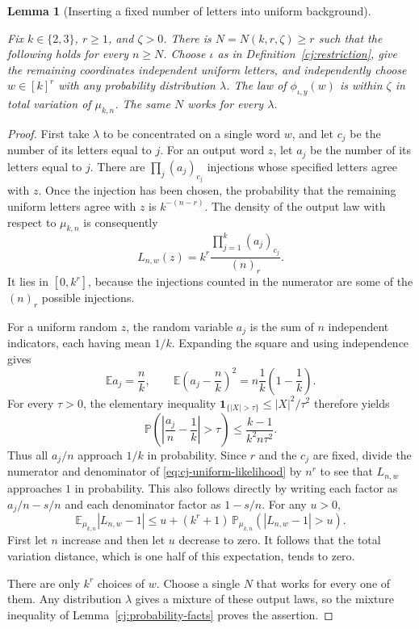 \documentclass[11pt]{amsart}
\newcommand{\one}{\mathbf 1}
\newtheorem{lemma}[theorem]{Lemma}
\theoremstyle{definition}
\theoremstyle{remark}
\numberwithin{equation}{section}
\providecommand{\lean}[1]{}
\providecommand{\leanok}{}
\begin{document}
\begin{lemma}[Inserting a fixed number of letters into uniform background]
\label{cj:transfer-uniform}
\lean{Auto.cj_transfer_uniform}
\leanok
Fix $k\in\{2,3\}$, $r\ge1$, and $\zeta>0$.  There is
$N=N(k,r,\zeta)\ge r$ such that the following holds for every $n\ge N$.
Choose $\iota$ as in Definition~\ref{cj:restriction}, give the
remaining coordinates independent uniform letters, and independently
choose $w\in[k]^r$ with any probability distribution $\lambda$.
The law of $\phi_{\iota,y}(w)$ is within $\zeta$ in total variation
of $\mu_{k,n}$.  The same $N$ works for every $\lambda$.
\end{lemma}
\begin{proof}
First take $\lambda$ to be concentrated on a single word $w$, and
let $c_j$ be the number of its letters equal to $j$.  For an output
word $z$, let $a_j$ be the number of its letters equal to $j$.
There are $\prod_j(a_j)_{c_j}$ injections whose specified letters
agree with $z$.  Once the injection has been chosen, the probability
that the remaining uniform letters agree with $z$ is $k^{-(n-r)}$.
The density of the output law with respect to $\mu_{k,n}$ is consequently
\begin{equation}\label{eq:cj-uniform-likelihood}
 L_{n,w}(z)=k^r\frac{\prod_{j=1}^k(a_j)_{c_j}}{(n)_r}.
\end{equation}
It lies in $[0,k^r]$, because the injections counted in the numerator
are some of the $(n)_r$ possible injections.

For a uniform random $z$, the random variable $a_j$ is the sum of
$n$ independent indicators, each having mean $1/k$.  Expanding the
square and using independence gives
\[
 \mathbb E a_j=\frac nk,
 \qquad
 \mathbb E\left(a_j-\frac nk\right)^2
       =n\frac1k\left(1-\frac1k\right).
\]
For every $\tau>0$, the elementary inequality
$\one_{\{|X|>\tau\}}\le |X|^2/\tau^2$ therefore yields
\[
 \mathbb P\left(\left|\frac{a_j}{n}-\frac1k\right|>\tau\right)
 \le\frac{k-1}{k^2n\tau^2}.
\]
Thus all $a_j/n$ approach $1/k$ in probability.  Since $r$ and the
$c_j$ are fixed, divide the numerator and denominator of
\eqref{eq:cj-uniform-likelihood} by $n^r$ to see that $L_{n,w}$
approaches $1$ in probability.  This also follows directly by writing
each factor as $a_j/n-s/n$ and each denominator factor as $1-s/n$.
For any $u>0$,
\[
 \mathbb E_{\mu_{k,n}}|L_{n,w}-1|
 \le u+(k^r+1)\,
       \mathbb P_{\mu_{k,n}}(|L_{n,w}-1|>u).
\]
First let $n$ increase and then let $u$ decrease to zero.  It follows
that the total variation distance, which is one half of this
expectation, tends to zero.

There are only $k^r$ choices of $w$.  Choose a single $N$ that works
for every one of them.  Any distribution $\lambda$ gives a mixture
of these output laws, so the mixture inequality of
Lemma~\ref{cj:probability-facts} proves the assertion.
\end{proof}
\end{document}
